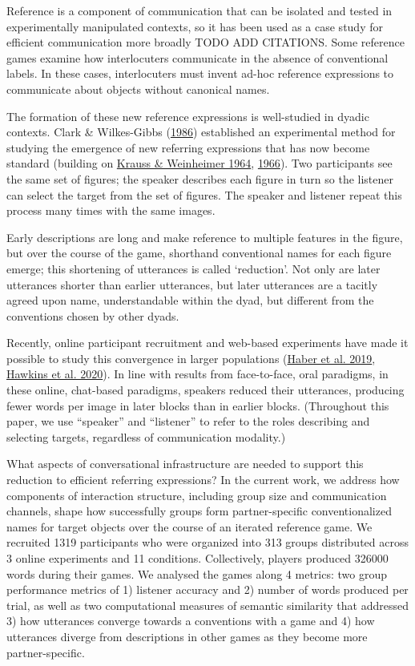 \documentclass[
  english,
  a4paper,
]{article}
\begin{document}
Reference is a component of communication that can be isolated and tested in experimentally manipulated contexts, so it has been used as a case study for efficient communication more broadly TODO ADD CITATIONS. Some reference games examine how interlocuters communicate in the absence of conventional labels. In these cases, interlocuters must invent ad-hoc reference expressions to communicate about objects without canonical names.

The formation of these new reference expressions is well-studied in dyadic contexts. Clark \& Wilkes-Gibbs (\protect\hyperlink{ref-clark1986}{1986}) established an experimental method for studying the emergence of new referring expressions that has now become standard (building on \protect\hyperlink{ref-krauss1964}{Krauss \& Weinheimer 1964}, \protect\hyperlink{ref-krauss1966}{1966}). Two participants see the same set of figures; the speaker describes each figure in turn so the listener can select the target from the set of figures. The speaker and listener repeat this process many times with the same images.

Early descriptions are long and make reference to multiple features in the figure, but over the course of the game, shorthand conventional names for each figure emerge; this shortening of utterances is called `reduction'. Not only are later utterances shorter than earlier utterances, but later utterances are a tacitly agreed upon name, understandable within the dyad, but different from the conventions chosen by other dyads.

Recently, online participant recruitment and web-based experiments have made it possible to study this convergence in larger populations (\protect\hyperlink{ref-haber2019}{Haber et al. 2019}, \protect\hyperlink{ref-hawkins2020}{Hawkins et al. 2020}). In line with results from face-to-face, oral paradigms, in these online, chat-based paradigms, speakers reduced their utterances, producing fewer words per image in later blocks than in earlier blocks. (Throughout this paper, we use ``speaker'' and ``listener'' to refer to the roles describing and selecting targets, regardless of communication modality.)

What aspects of conversational infrastructure are needed to support this reduction to efficient referring expressions? In the current work, we address how components of interaction structure, including group size and communication channels, shape how successfully groups form partner-specific conventionalized names for target objects over the course of an iterated reference game. We recruited 1319 participants who were organized into 313 groups distributed across 3 online experiments and 11 conditions. Collectively, players produced 326000 words during their games. We analysed the games along 4 metrics: two group performance metrics of 1) listener accuracy and 2) number of words produced per trial, as well as two computational measures of semantic similarity that addressed 3) how utterances converge towards a conventions with a game and 4) how utterances diverge from descriptions in other games as they become more partner-specific.
\end{document}
